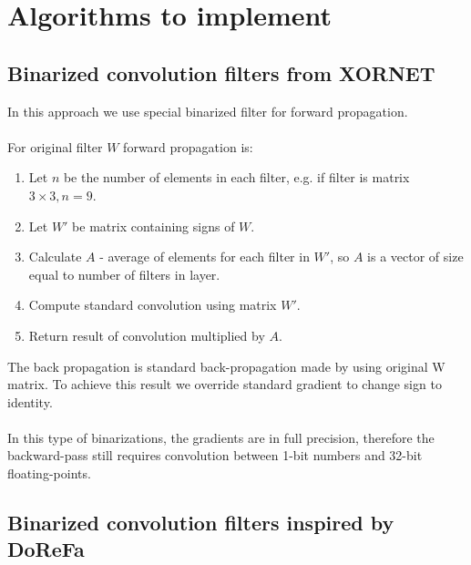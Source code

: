 \documentclass[licencjacka]{pracamgr}
\begin{document}
	\section{Algorithms to implement}

		\subsection{Binarized convolution filters from XORNET \cite{xornet}}

        In this approach we use special binarized filter for forward propagation.
        \\\\
        For original filter $W$ forward propagation is:
        \begin{enumerate}
                \item Let $n$ be the number of elements in each filter, e.g. if filter is matrix $3 \times 3, n=9$.
                \item Let $W'$ be matrix containing signs of $W$.
                \item Calculate $A$ - average of elements for each filter in $W'$, so $A$ is a vector of size equal to number of filters in layer.
                \item Compute standard convolution using matrix $W'$.
                \item Return result of convolution multiplied by $A$.
        \end{enumerate}
        The back propagation is standard back-propagation made by using original W matrix. To achieve this result we override standard gradient to change sign to identity.
        \\\\
        In this type of binarizations, the gradients are in full precision, therefore the backward-pass still requires convolution between 1-bit numbers and 32-bit floating-points.


		\subsection{Binarized convolution filters inspired by DoReFa \cite{dorefa}}
\end{document}
